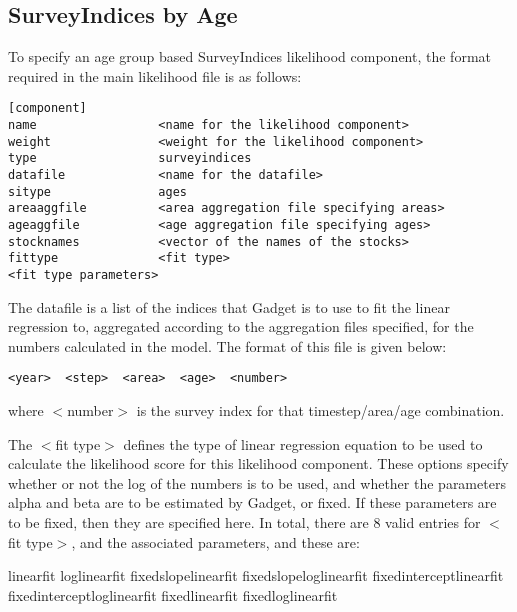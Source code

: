 \documentclass [a4paper, 10pt]{book}
\begin{document}
\subsection{SurveyIndices by Age}\label{subsec:sibyage}
To specify an age group based SurveyIndices likelihood component, the format required in the main likelihood file is as follows:

{\small\begin{verbatim}
[component]
name                 <name for the likelihood component>
weight               <weight for the likelihood component>
type                 surveyindices
datafile             <name for the datafile>
sitype               ages
areaaggfile          <area aggregation file specifying areas>
ageaggfile           <age aggregation file specifying ages>
stocknames           <vector of the names of the stocks>
fittype              <fit type>
<fit type parameters>
\end{verbatim}}

The datafile is a list of the indices that Gadget is to use to fit the linear regression to, aggregated according to the aggregation files specified, for the numbers calculated in the model.  The format of this file is given below:

{\small\begin{verbatim}
<year>  <step>  <area>  <age>  <number>
\end{verbatim}}

where $<$number$>$ is the survey index for that timestep/area/age combination.

\bigskip
The $<$fit type$>$ defines the type of linear regression equation to be used to calculate the likelihood score for this likelihood component.  These options specify whether or not the log of the numbers is to be used, and whether the parameters alpha and beta are to be estimated by Gadget, or fixed.  If these parameters are to be fixed, then they are specified here.  In total, there are 8 valid entries for $<$fit type$>$, and the associated parameters, and these are:

\bigskip
linearfit\newline
loglinearfit\newline
fixedslopelinearfit\newline
fixedslopeloglinearfit\newline
fixedinterceptlinearfit\newline
fixedinterceptloglinearfit\newline
fixedlinearfit\newline
fixedloglinearfit
\end{document}
